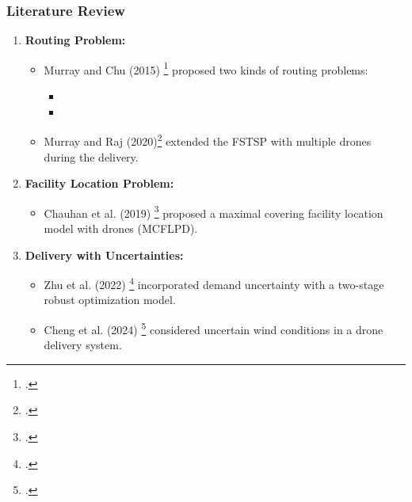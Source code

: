 \documentclass[aspectratio=169]{beamer}
\begin{document}
\begin{frame}
\frametitle{Literature Review}
\footnotesize
    \begin{enumerate}[label=\arabic*.]
        \item \textbf{Routing Problem:} 
        \begin{itemize}[label=$\star$]
          \item Murray and Chu (2015) \footcite{murray2015flying} proposed two kinds of routing problems:
          \begin{itemize}[label=$\diamond$]
            \item {}
            \item {}
          \end{itemize}
          \item Murray and Raj (2020)\footcite{murray2020multiple} extended the FSTSP with multiple drones during the delivery.
        \end{itemize}
        \item \textbf{Facility Location Problem:}
        \begin{itemize}[label=$\diamond$] 
          \item Chauhan et al. (2019) \footcite{chauhan2019maximum} proposed a maximal covering facility location model with drones (MCFLPD).
        \end{itemize}
        \item \textbf{Delivery with Uncertainties:}
        \begin{itemize}[label=$\diamond$]
          \item Zhu et al. (2022) \footcite{zhu2022two} incorporated demand uncertainty with a two-stage robust optimization model.
          \item Cheng et al. (2024) \footcite{cheng2024robust} considered uncertain wind conditions in a drone delivery system.
        \end{itemize}
    \end{enumerate}
\end{frame}
\end{document}

